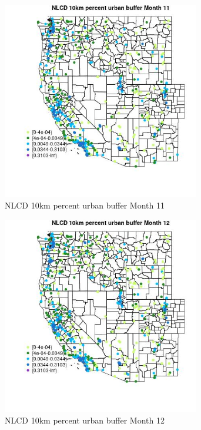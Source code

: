 \begin{figure} 
\centering  
\includegraphics[width=0.77\textwidth]{Code_Outputs/Report_ML_input_PM25_Step4_part_e_de_duplicated_aves_compiled_2019-05-14wNAs_MapObsMo11NLCD_10km_percent_urban_buffer.jpg} 
\caption{\label{fig:Report_ML_input_PM25_Step4_part_e_de_duplicated_aves_compiled_2019-05-14wNAsMapObsMo11NLCD_10km_percent_urban_buffer}NLCD 10km percent urban buffer Month 11} 
\end{figure} 
 

\begin{figure} 
\centering  
\includegraphics[width=0.77\textwidth]{Code_Outputs/Report_ML_input_PM25_Step4_part_e_de_duplicated_aves_compiled_2019-05-14wNAs_MapObsMo12NLCD_10km_percent_urban_buffer.jpg} 
\caption{\label{fig:Report_ML_input_PM25_Step4_part_e_de_duplicated_aves_compiled_2019-05-14wNAsMapObsMo12NLCD_10km_percent_urban_buffer}NLCD 10km percent urban buffer Month 12} 
\end{figure} 
 
